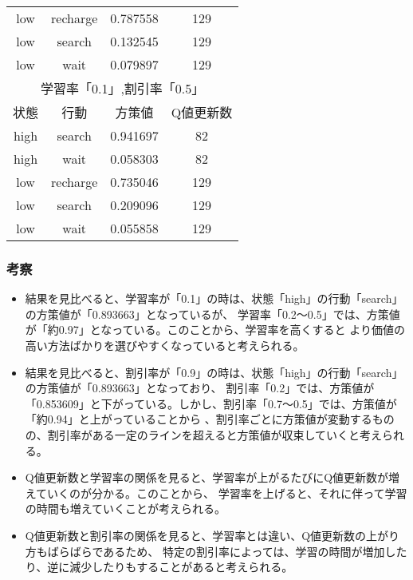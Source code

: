 \begin{table}[b]
\begin{minipage}[!t]{0.45\hsize}
\begin{tabular}{|c|c|c|c|}
      low & recharge & 0.787558 & 129 \\
      low & search & 0.132545 & 129 \\
      low & wait & 0.079897 & 129 \\
      \hline\hline
      \multicolumn{4}{|c|}{学習率「0.1」,割引率「0.5」} \\
      \hline
      状態 & 行動 & 方策値 & Q値更新数\\
      \hline
      high & search & 0.941697 & 82 \\
      high & wait & 0.058303 & 82 \\\hline
      low & recharge & 0.735046 & 129 \\
      low & search & 0.209096 & 129 \\
      low & wait & 0.055858 & 129 \\
      \hline
    \end{tabular}
  \end{minipage}
\end{table}
\subsubsection{考察}
\begin{itemize}
  \item 結果を見比べると、学習率が「0.1」の時は、状態「high」の行動「search」の方策値が「0.893663」となっているが、
  学習率「0.2～0.5」では、方策値が「約0.97」となっている。このことから、学習率を高くすると
  より価値の高い方法ばかりを選びやすくなっていると考えられる。
  \item 結果を見比べると、割引率が「0.9」の時は、状態「high」の行動「search」の方策値が「0.893663」となっており、
  割引率「0.2」では、方策値が「0.853609」と下がっている。しかし、割引率「0.7～0.5」では、方策値が「約0.94」と上がっていることから
  、割引率ごとに方策値が変動するものの、割引率がある一定のラインを超えると方策値が収束していくと考えられる。
  \item Q値更新数と学習率の関係を見ると、学習率が上がるたびにQ値更新数が増えていくのが分かる。このことから、
  学習率を上げると、それに伴って学習の時間も増えていくことが考えられる。
  \item Q値更新数と割引率の関係を見ると、学習率とは違い、Q値更新数の上がり方もばらばらであるため、
  特定の割引率によっては、学習の時間が増加したり、逆に減少したりもすることがあると考えられる。
\end{itemize}